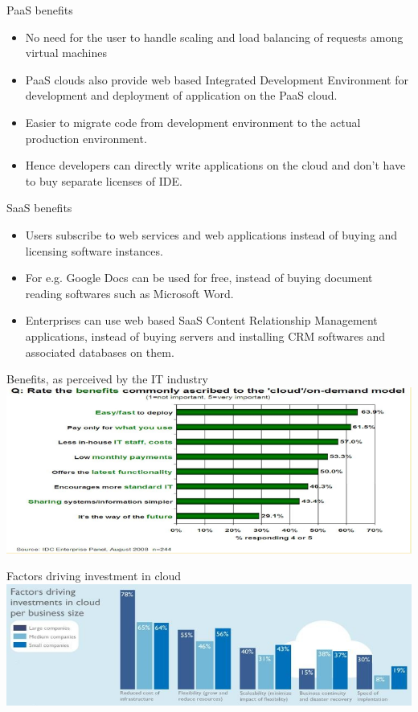 \documentclass{SKP-beamer}
\begin{document}
\begin{frame}{PaaS benefits}
	\begin{itemize}
		\item No need for the user to handle scaling and load balancing of requests among virtual machines
		\item PaaS clouds also provide web based Integrated Development Environment for development and deployment of application on the PaaS cloud.
		\item Easier to migrate code from development environment to the actual production environment.
		\item Hence developers can directly write applications on the cloud and
		don’t have to buy separate licenses of IDE.	
	\end{itemize}
\end{frame}

\begin{frame}{SaaS benefits}
	\begin{itemize}
		\item Users subscribe to web services and web applications instead of buying and licensing software instances.
		\item For e.g. Google Docs can be used for free, instead of buying document reading softwares such as Microsoft Word.
		\item Enterprises can use web based SaaS Content Relationship Management	applications, instead of buying servers and installing CRM softwares and associated databases on them.
		
	\end{itemize}
\end{frame}

\begin{frame}{Benefits, as perceived by the IT industry}
	\includegraphics[scale=0.7]{c.png}
\end{frame}

\begin{frame}{Factors driving investment in cloud}
	\includegraphics[scale=0.6]{d.png}
\end{frame}
\end{document}
